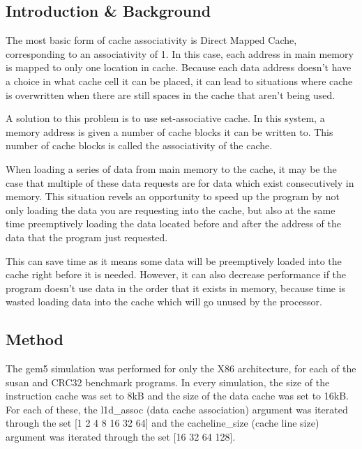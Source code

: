 
\subsection{Introduction \& Background}

The most basic form of cache associativity is Direct Mapped Cache, corresponding to an
associativity of 1.
In this case, each address in main memory is mapped to only one location in cache.
Because each data address doesn't have a choice in what cache cell it can be placed, 
it can lead to situations where cache is overwritten when there are still spaces in 
the cache that aren't being used.

A solution to this problem is to use set-associative cache. 
In this system, a memory address is given a number of cache blocks it can be written to.
This number of cache blocks is called the associativity of the cache.

When loading a series of data from main memory to the cache, it may be the case that 
multiple of these data requests are for data which exist consecutively in memory.
This situation revels an opportunity to speed up the program by not only loading 
the data you are requesting into the cache, but also at the same time preemptively loading 
the data located before and after the address of the data that the program just requested.

This can save time as it means some data will be preemptively loaded into the cache right 
before it is needed.
However, it can also decrease performance if the program doesn't use data in the order that 
it exists in memory, because time is wasted loading data into the cache which will go unused 
by the processor.

\subsection{Method}

The gem5 simulation was performed for only the X86 architecture, for each of the 
susan and CRC32 benchmark programs. 
In every simulation, the size of the instruction cache was set to 8kB and the size 
of the data cache was set to 16kB.
For each of these, the l1d\_assoc (data cache association) argument was iterated 
through the set [1 2 4 8 16 32 64] and the cacheline\_size (cache line size) argument 
was iterated through the set [16 32 64 128].

